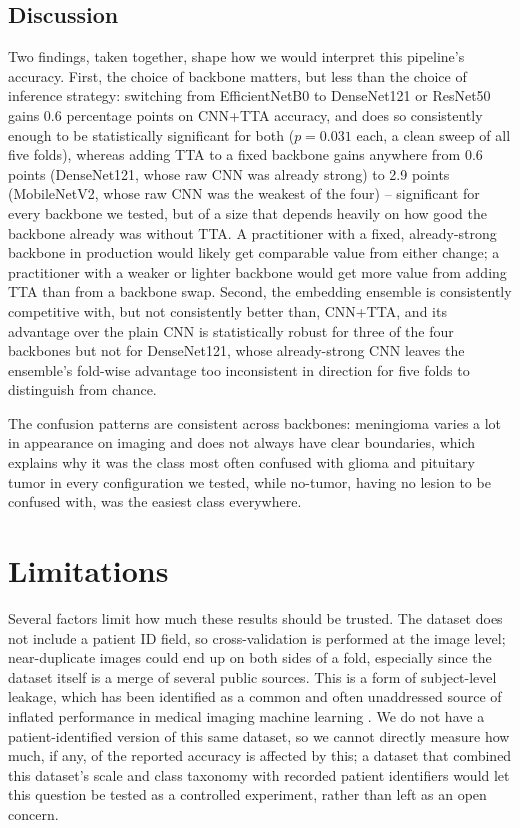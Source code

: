 \documentclass[11pt]{article}
\begin{document}
\subsection{Discussion}
\label{sec:discussion}

Two findings, taken together, shape how we would interpret this pipeline's accuracy. First, the choice of backbone matters, but less than the choice of inference strategy: switching from EfficientNetB0 to DenseNet121 or ResNet50 gains 0.6 percentage points on CNN+TTA accuracy, and does so consistently enough to be statistically significant for both ($p=0.031$ each, a clean sweep of all five folds), whereas adding TTA to a fixed backbone gains anywhere from 0.6 points (DenseNet121, whose raw CNN was already strong) to 2.9 points (MobileNetV2, whose raw CNN was the weakest of the four) -- significant for every backbone we tested, but of a size that depends heavily on how good the backbone already was without TTA. A practitioner with a fixed, already-strong backbone in production would likely get comparable value from either change; a practitioner with a weaker or lighter backbone would get more value from adding TTA than from a backbone swap. Second, the embedding ensemble is consistently competitive with, but not consistently better than, CNN+TTA, and its advantage over the plain CNN is statistically robust for three of the four backbones but not for DenseNet121, whose already-strong CNN leaves the ensemble's fold-wise advantage too inconsistent in direction for five folds to distinguish from chance.

The confusion patterns are consistent across backbones: meningioma varies a lot in appearance on imaging and does not always have clear boundaries, which explains why it was the class most often confused with glioma and pituitary tumor in every configuration we tested, while no-tumor, having no lesion to be confused with, was the easiest class everywhere.


\section{Limitations}
\label{sec:limitations}
Several factors limit how much these results should be trusted. The dataset does not include a patient ID field, so cross-validation is performed at the image level; near-duplicate images could end up on both sides of a fold, especially since the dataset itself is a merge of several public sources. This is a form of subject-level leakage, which has been identified as a common and often unaddressed source of inflated performance in medical imaging machine learning \cite{varoquaux2022leakage}. We do not have a patient-identified version of this same dataset, so we cannot directly measure how much, if any, of the reported accuracy is affected by this; a dataset that combined this dataset's scale and class taxonomy with recorded patient identifiers would let this question be tested as a controlled experiment, rather than left as an open concern.
\end{document}

